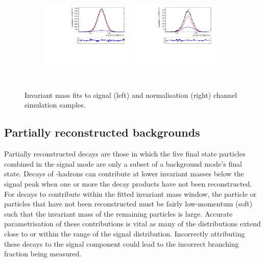 \begin{figure}[!h]
    \centering
    \begin{subfigure}[t]{1.0\textwidth}
        \includegraphics[width=0.48\textwidth]{figs/B2DsKK/Plot_Signal_Fit_All_B2DsKK_Ds2KKPi.pdf}
        \includegraphics[width=0.48\textwidth]{figs/B2DsKK/Plot_Signal_Fit_All_B2DsD0_Ds2KKPi.pdf}
    \end{subfigure}\\
    \caption{Invariant mass fits to signal (left) and normalisation (right) channel simulation samples.}
    \label{fig:B2DsKK_signal_fits}   
\end{figure}


\subsection{Partially reconstructed backgrounds}
\label{sec:B2DsKK_partrecocomps}

Partially reconstructed decays are those in which the five final state particles combined in the signal mode are only a subset of a background mode's final state.
Decays of \bquark-hadrons can contribute at lower invariant masses below the signal peak when one or more the decay products have not been reconstructed. 
For decays to contribute within the fitted \Bp invariant mass window, the particle or particles that have not been reconstructed must be fairly low-momentum (soft) such that the invariant mass of the remaining particles is large. Accurate parametrisation of these contributions is vital as many of the distributions extend close to or within the range of the signal distribution. Incorrectly attributing these decays to the signal component could lead to the incorrect branching fraction being measured. 

